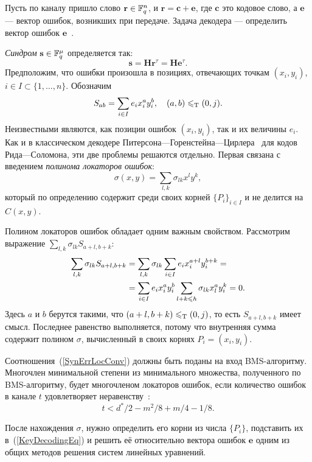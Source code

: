\documentclass[14pt]{extarticle}
\begin{document}
Пусть по каналу пришло слово $\mathbf r\in\field^n$, и $\mathbf{r = c + e}$, где
$\mathbf c$ это кодовое слово, а $\mathbf e$ — вектор ошибок, возникших при
передаче. Задача декодера — определить вектор ошибок $\mathbf e$~\cite[раздел~IV]{Justesen92}.

\emph{Синдром} $\mathbf s \in \field^\mu$ определяется так:
$$\mathbf {s = H} \mathbf r^\tau = \mathbf H \mathbf e^\tau.$$
Предположим, что ошибки произошла в позициях, отвечающих точкам $(x_i,y_i)$, 
$i\in I\subset \{1, \ldots, n\}$. Обозначим 
\begin{equation}\label{KeyDecodingEq}
	S_{ab} = \sum_{i\in I} e_i x_i^a y_i^b, \quad (a,b) \letot (0,j).
\end{equation}
Неизвестными являются, как позиции ошибок $(x_i,y_i)$, так и их величины $e_i$.
Как и в классическом декодере
Пи\-тер\-со\-на—Го\-рен\-стей\-на—Цир\-ле\-ра~\cite{Blahut86} для кодов
Рида—Соломона, эти две проблемы решаются отдельно. Первая связана с введением
\emph{полинома локаторов ошибок}:
$$ \sigma(x, y) = \sum_{l,k} \sigma_{lk}x^l y^k,$$
который по определению содержит среди своих корней $\{P_i\}_{i\in I}$ и не
делится на $C(x,y)$.

Полином локаторов ошибок обладает одним важным свойством. Рассмотрим выражение
$\sum_{l,k}\sigma_{lk}S_{a+l,b+k}$:
\begin{align}\label{SynErrLocConv}
\sum_{l,k}\sigma_{lk}S_{a+l,b+k} & = \sum_{l,k}\sigma_{lk}\sum_{i\in
I} e_ix_i^{a+l}y_i^{b+k}={}\notag\\ &=\sum_{i\in I}e_ix_i^ay_i^b\sum_{l+k\leq
h}\sigma_{lk}x_l^ay_i^k=0.
\end{align}
Здесь $a$ и $b$ берутся такими, что $(a+l,b+k) \letot (0,j)$, то есть
$S_{a+l,b+k}$ имеет смысл. Последнее равенство выполняется, потому что
внутренняя сумма содержит полином $\sigma$, вычисленный в своих корнях
$P_i=(x_i,y_i)$.

Соотношения~(\ref{SynErrLocConv}) должны быть поданы на вход BMS-алгоритму.
Многочлен минимальной степени из минимального множества, полученного по
BMS-алгоритму, будет многочленом локаторов ошибок, если количество ошибок в
канале $t$ удовлетворяет неравенству~\cite[Теорема 4]{Justesen92}:
\begin{equation}\label{ErrorsBound}t<d^*/2 - m^2/8 + m/4 - 1/8.\end{equation}

После нахождения $\sigma$, нужно определить его корни из числа $\{P_i\}$,
подставить их в~(\ref{KeyDecodingEq}) и решить её относительно вектора ошибок
$\mathbf e$ одним из общих методов решения систем линейных уравнений.
\end{document}
